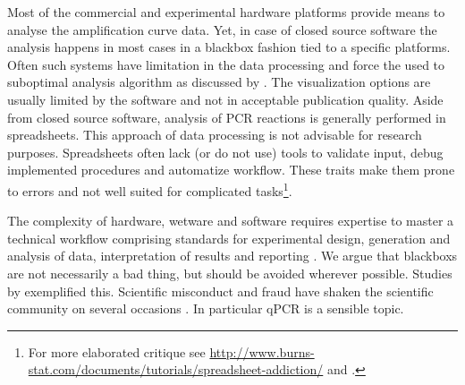Most of the commercial and experimental hardware platforms provide means to 
analyse the amplification curve data. Yet, in case of closed source software 
the analysis happens in most cases in a blackbox fashion tied to a specific 
platforms. Often such systems have limitation in the data processing and force 
the used to suboptimal analysis algorithm as discussed by \citet{ruijter_2013}. 
The visualization options are usually limited by the software and not in 
acceptable publication quality. Aside from closed source software, analysis of 
PCR reactions is generally performed in spreadsheets. This approach of data 
processing is not advisable for research purposes. Spreadsheets often lack (or 
do not use) tools to validate input, debug implemented procedures and 
automatize workflow. These traits make them prone to errors and not well suited 
for complicated tasks\footnote{For more elaborated critique see 
\url{http://www.burns-stat.com/documents/tutorials/spreadsheet-addiction/} and 
\citet{mccullough_2008}.}.

The complexity of hardware, wetware and software requires expertise to master a 
technical workflow comprising standards for experimental design, generation and 
analysis of data, interpretation of results and reporting 
\citep{huggett_BDQ_2014}. We argue that blackboxs are not necessarily a bad 
thing, but should be avoided wherever possible. Studies by 
\citet{mccullough_2008, Almiron_2010, Duran_2014} exemplified this. Scientific 
misconduct and fraud have shaken the scientific community on several occasions 
\citep{fang_2012}. In particular qPCR is a sensible topic.

